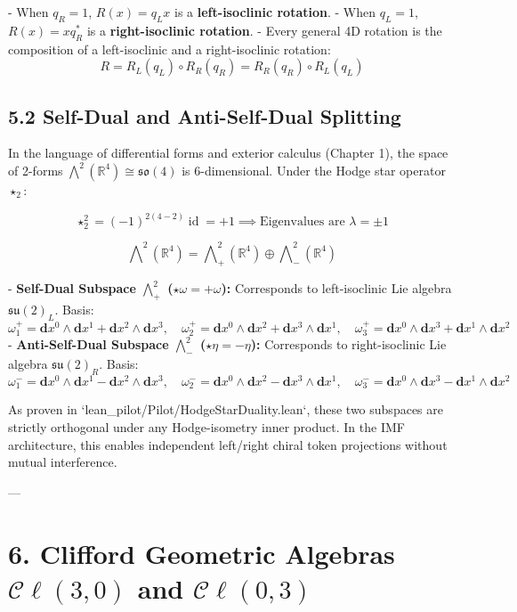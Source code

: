 \documentclass[11pt,twoside,openright]{amsbook}
\begin{document}
{{{{{{- When $q_R = 1$, $R(x) = q_L x$ is a \textbf{left-isoclinic rotation}.
- When $q_L = 1$, $R(x) = x q_R^*$ is a \textbf{right-isoclinic rotation}.
- Every general 4D rotation is the composition of a left-isoclinic and a right-isoclinic rotation:
  $$R = R_L(q_L) \circ R_R(q_R) = R_R(q_R) \circ R_L(q_L)$$

\subsection{5.2 Self-Dual and Anti-Self-Dual Splitting}

In the language of differential forms and exterior calculus (Chapter 1), the space of 2-forms $\bigwedge^2(\mathbb{R}^4) \cong \mathfrak{so}(4)$ is 6-dimensional. Under the Hodge star operator $\star_2$:

$$\star_2^2 = (-1)^{2(4-2)} \operatorname{id} = +1 \implies \text{Eigenvalues are } \lambda = \pm 1$$

$$\bigwedge\nolimits^2(\mathbb{R}^4) = \bigwedge\nolimits^2_+(\mathbb{R}^4) \oplus \bigwedge\nolimits^2_-(\mathbb{R}^4)$$

- \textbf{Self-Dual Subspace $\bigwedge^2_+$ ($\star \omega = +\omega$):} Corresponds to left-isoclinic Lie algebra $\mathfrak{su}(2)_L$. Basis:
  $$\omega_1^+ = \mathbf{d}x^0 \wedge \mathbf{d}x^1 + \mathbf{d}x^2 \wedge \mathbf{d}x^3, \quad \omega_2^+ = \mathbf{d}x^0 \wedge \mathbf{d}x^2 + \mathbf{d}x^3 \wedge \mathbf{d}x^1, \quad \omega_3^+ = \mathbf{d}x^0 \wedge \mathbf{d}x^3 + \mathbf{d}x^1 \wedge \mathbf{d}x^2$$
- \textbf{Anti-Self-Dual Subspace $\bigwedge^2_-$ ($\star \eta = -\eta$):} Corresponds to right-isoclinic Lie algebra $\mathfrak{su}(2)_R$. Basis:
  $$\omega_1^- = \mathbf{d}x^0 \wedge \mathbf{d}x^1 - \mathbf{d}x^2 \wedge \mathbf{d}x^3, \quad \omega_2^- = \mathbf{d}x^0 \wedge \mathbf{d}x^2 - \mathbf{d}x^3 \wedge \mathbf{d}x^1, \quad \omega_3^- = \mathbf{d}x^0 \wedge \mathbf{d}x^3 - \mathbf{d}x^1 \wedge \mathbf{d}x^2$$

As proven in `lean_pilot/Pilot/HodgeStarDuality.lean`, these two subspaces are strictly orthogonal under any Hodge-isometry inner product. In the IMF architecture, this enables independent left/right chiral token projections without mutual interference.

---

\section{6. Clifford Geometric Algebras $\mathcal{C}\ell(3,0)$ and $\mathcal{C}\ell(0,3)$}

}}}}}}
\end{document}
